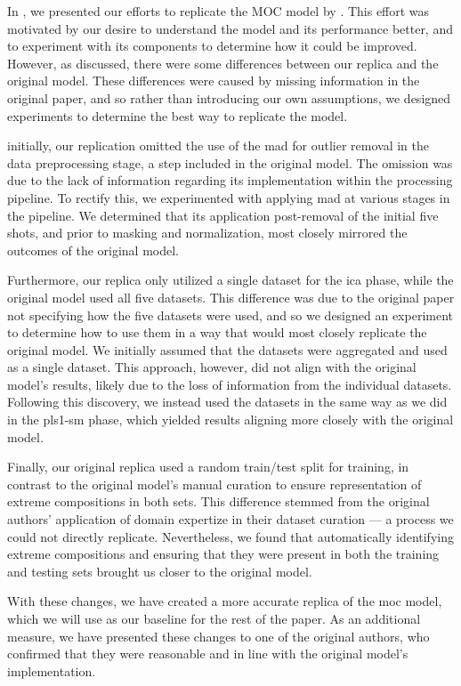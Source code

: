 In \citet{p9_paper}, we presented our efforts to replicate the MOC model by \citet{cleggRecalibrationMarsScience2017}.
This effort was motivated by our desire to understand the model and its performance better, and to experiment with its components to determine how it could be improved.
However, as discussed, there were some differences between our replica and the original model.
These differences were caused by missing information in the original paper, and so rather than introducing our own assumptions, we designed experiments to determine the best way to replicate the model.

initially, our replication omitted the use of the \gls{mad} for outlier removal in the data preprocessing stage, a step included in the original model.
The omission was due to the lack of information regarding its implementation within the processing pipeline.
To rectify this, we experimented with applying \gls{mad} at various stages in the pipeline.
We determined that its application post-removal of the initial five shots, and prior to masking and normalization, most closely mirrored the outcomes of the original model.

Furthermore, our replica only utilized a single dataset for the \gls{ica} phase, while the original model used all five datasets.
This difference was due to the original paper not specifying how the five datasets were used, and so we designed an experiment to determine how to use them in a way that would most closely replicate the original model.
We initially assumed that the datasets were aggregated and used as a single dataset.
This approach, however, did not align with the original model's results, likely due to the loss of information from the individual datasets.
Following this discovery, we instead used the datasets in the same way as we did in the \gls{pls1-sm} phase, which yielded results aligning more closely with the original model.

Finally, our original replica used a random train/test split for training, in contrast to the original model's manual curation to ensure representation of extreme compositions in both sets.
This difference stemmed from the original authors' application of domain expertize in their dataset curation --- a process we could not directly replicate.
Nevertheless, we found that automatically identifying extreme compositions and ensuring that they were present in both the training and testing sets brought us closer to the original model.

With these changes, we have created a more accurate replica of the \gls{moc} model, which we will use as our baseline for the rest of the paper.
As an additional measure, we have presented these changes to one of the original authors, who confirmed that they were reasonable and in line with the original model's implementation.

